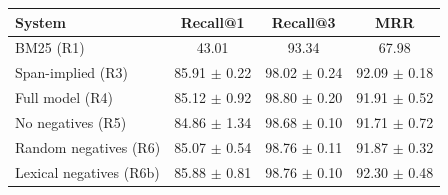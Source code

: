 \begin{tabular}{lccc}
\hline
System & Recall@1 & Recall@3 & MRR \\
\hline
BM25 (R1) & 43.01 & 93.34 & 67.98 \\
Span-implied (R3) & 85.91 $\pm$ 0.22 & 98.02 $\pm$ 0.24 & 92.09 $\pm$ 0.18 \\
Full model (R4) & 85.12 $\pm$ 0.92 & 98.80 $\pm$ 0.20 & 91.91 $\pm$ 0.52 \\
No negatives (R5) & 84.86 $\pm$ 1.34 & 98.68 $\pm$ 0.10 & 91.71 $\pm$ 0.72 \\
Random negatives (R6) & 85.07 $\pm$ 0.54 & 98.76 $\pm$ 0.11 & 91.87 $\pm$ 0.32 \\
Lexical negatives (R6b) & 85.88 $\pm$ 0.81 & 98.76 $\pm$ 0.10 & 92.30 $\pm$ 0.48 \\
\hline
\end{tabular}
